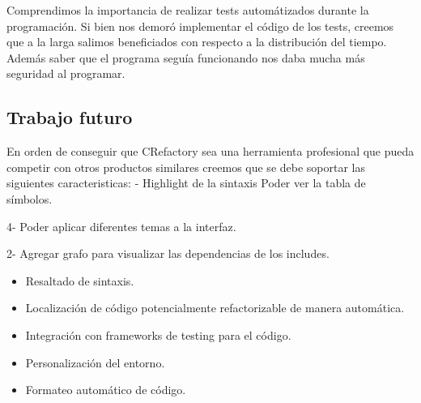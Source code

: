 \documentclass[a4paper,oneside,10pt]{article}
\begin{document}
Comprendimos la importancia de realizar tests automátizados durante la programación. Si bien nos demoró implementar el código de los tests, creemos que a la larga salimos beneficiados con respecto a la distribución del tiempo. Además saber que el programa seguía funcionando nos daba mucha más seguridad al programar.

\subsection{Trabajo futuro}
En orden de conseguir que CRefactory sea una herramienta profesional que pueda competir con otros productos similares creemos que se debe soportar las siguientes caracteristicas:
- Highlight de la sintaxis
Poder ver la tabla de símbolos.

4- Poder aplicar diferentes temas a la interfaz.

2- Agregar grafo para visualizar las dependencias de los includes.
\begin{itemize}
	\item Resaltado de sintaxis.
	\item Localizaci\'on de c\'odigo potencialmente refactorizable de manera autom\'atica.
	\item Integraci\'on con frameworks de testing para el c\'odigo.
	\item Personalizaci\'on del entorno.
	\item Formateo autom\'atico de c\'odigo.
\end{itemize}
\end{document}
